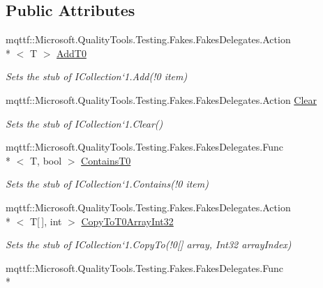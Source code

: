 \subsection*{Public Attributes}
\begin{DoxyCompactItemize}
\item 
mqttf\-::\-Microsoft.\-Quality\-Tools.\-Testing.\-Fakes.\-Fakes\-Delegates.\-Action\\*
$<$ T $>$ \hyperlink{class_system_1_1_collections_1_1_generic_1_1_fakes_1_1_stub_i_collection_3_01_t_01_4_a8fe6020bd2c35e0dbdb28d3b145276ef}{Add\-T0}
\begin{DoxyCompactList}\small\item\em Sets the stub of I\-Collection`1.Add(!0 item)\end{DoxyCompactList}\item 
mqttf\-::\-Microsoft.\-Quality\-Tools.\-Testing.\-Fakes.\-Fakes\-Delegates.\-Action \hyperlink{class_system_1_1_collections_1_1_generic_1_1_fakes_1_1_stub_i_collection_3_01_t_01_4_af52c7f20534cc248bc244ad35ba12470}{Clear}
\begin{DoxyCompactList}\small\item\em Sets the stub of I\-Collection`1.Clear()\end{DoxyCompactList}\item 
mqttf\-::\-Microsoft.\-Quality\-Tools.\-Testing.\-Fakes.\-Fakes\-Delegates.\-Func\\*
$<$ T, bool $>$ \hyperlink{class_system_1_1_collections_1_1_generic_1_1_fakes_1_1_stub_i_collection_3_01_t_01_4_abbb4db7f06ffeac1610c098c71fd991d}{Contains\-T0}
\begin{DoxyCompactList}\small\item\em Sets the stub of I\-Collection`1.Contains(!0 item)\end{DoxyCompactList}\item 
mqttf\-::\-Microsoft.\-Quality\-Tools.\-Testing.\-Fakes.\-Fakes\-Delegates.\-Action\\*
$<$ T\mbox{[}$\,$\mbox{]}, int $>$ \hyperlink{class_system_1_1_collections_1_1_generic_1_1_fakes_1_1_stub_i_collection_3_01_t_01_4_a33bc83a10b51b63094bf69048fb5c74c}{Copy\-To\-T0\-Array\-Int32}
\begin{DoxyCompactList}\small\item\em Sets the stub of I\-Collection`1.Copy\-To(!0\mbox{[}\mbox{]} array, Int32 array\-Index)\end{DoxyCompactList}\item 
mqttf\-::\-Microsoft.\-Quality\-Tools.\-Testing.\-Fakes.\-Fakes\-Delegates.\-Func\\*

\end{DoxyCompactItemize}
